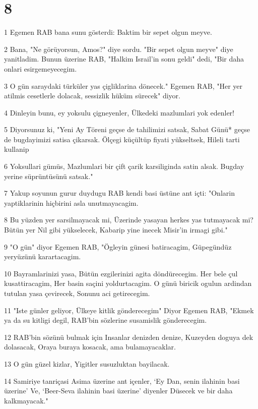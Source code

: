 \chapter{8}

\par 1 Egemen RAB bana sunu gösterdi: Baktim bir sepet olgun meyve.
\par 2 Bana, "Ne görüyorsun, Amos?" diye sordu. "Bir sepet olgun meyve" diye yanitladim. Bunun üzerine RAB, "Halkim Israil'in sonu geldi" dedi, "Bir daha onlari esirgemeyecegim.
\par 3 O gün saraydaki türküler yas çigliklarina dönecek." Egemen RAB, "Her yer atilmis cesetlerle dolacak, sessizlik hüküm sürecek" diyor.
\par 4 Dinleyin bunu, ey yoksulu çigneyenler, Ülkedeki mazlumlari yok edenler!
\par 5 Diyorsunuz ki, "Yeni Ay Töreni geçse de tahilimizi satsak, Sabat Günü* geçse de bugdayimizi satisa çikarsak. Ölçegi küçültüp fiyati yükseltsek, Hileli tarti kullanip
\par 6 Yoksullari gümüs, Mazlumlari bir çift çarik karsiliginda satin alsak. Bugday yerine süprüntüsünü satsak."
\par 7 Yakup soyunun gurur duydugu RAB kendi basi üstüne ant içti: "Onlarin yaptiklarinin hiçbirini asla unutmayacagim.
\par 8 Bu yüzden yer sarsilmayacak mi, Üzerinde yasayan herkes yas tutmayacak mi? Bütün yer Nil gibi yükselecek, Kabarip yine inecek Misir'in irmagi gibi."
\par 9 "O gün" diyor Egemen RAB, "Ögleyin günesi batiracagim, Güpegündüz yeryüzünü karartacagim.
\par 10 Bayramlarinizi yasa, Bütün ezgilerinizi agita döndürecegim. Her bele çul kusattiracagim, Her basin saçini yoldurtacagim. O günü biricik ogulun ardindan tutulan yasa çevirecek, Sonunu aci getirecegim.
\par 11 "Iste günler geliyor, Ülkeye kitlik gönderecegim" Diyor Egemen RAB, "Ekmek ya da su kitligi degil, RAB'bin sözlerine susamislik gönderecegim.
\par 12 RAB'bin sözünü bulmak için Insanlar denizden denize, Kuzeyden doguya dek dolasacak, Oraya buraya kosacak, ama bulamayacaklar.
\par 13 O gün güzel kizlar, Yigitler susuzluktan bayilacak.
\par 14 Samiriye tanriçasi Asima üzerine ant içenler, `Ey Dan, senin ilahinin basi üzerine' Ve, `Beer-Seva ilahinin basi üzerine' diyenler Düsecek ve bir daha kalkmayacak."

